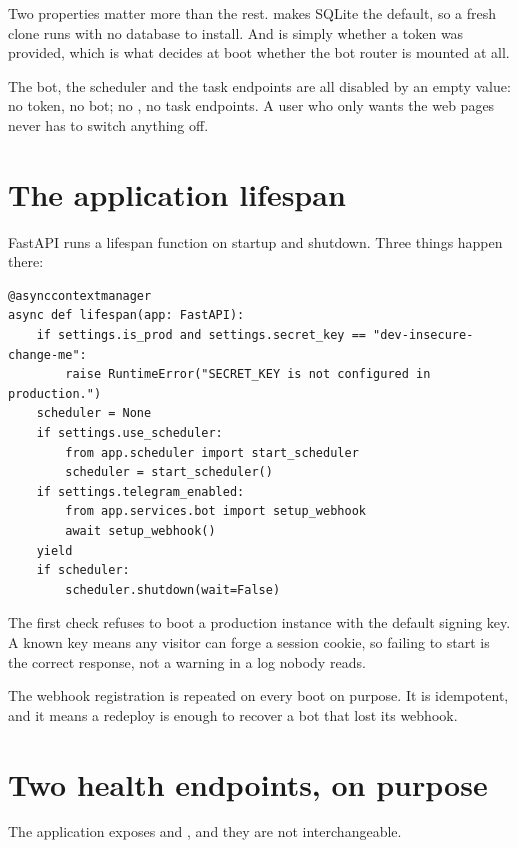 Two properties matter more than the rest.  makes SQLite
the default, so a fresh clone runs with no database to install. And
 is simply whether a token was provided, which is what
decides at boot whether the bot router is mounted at all.

\begin{keypoint}
The bot, the scheduler and the task endpoints are all disabled by an empty
value: no token, no bot; no , no task endpoints. A user who
only wants the web pages never has to switch anything off.
\end{keypoint}

\section{The application lifespan}

FastAPI runs a lifespan function on startup and shutdown. Three things happen
there:

\begin{lstlisting}[style=py]
@asynccontextmanager
async def lifespan(app: FastAPI):
    if settings.is_prod and settings.secret_key == "dev-insecure-change-me":
        raise RuntimeError("SECRET_KEY is not configured in production.")
    scheduler = None
    if settings.use_scheduler:
        from app.scheduler import start_scheduler
        scheduler = start_scheduler()
    if settings.telegram_enabled:
        from app.services.bot import setup_webhook
        await setup_webhook()
    yield
    if scheduler:
        scheduler.shutdown(wait=False)
\end{lstlisting}

The first check refuses to boot a production instance with the default signing
key. A known key means any visitor can forge a session cookie, so failing to
start is the correct response, not a warning in a log nobody reads.

The webhook registration is repeated on every boot on purpose. It is idempotent,
and it means a redeploy is enough to recover a bot that lost its webhook.

\section{Two health endpoints, on purpose}

The application exposes  and , and they are not
interchangeable.

